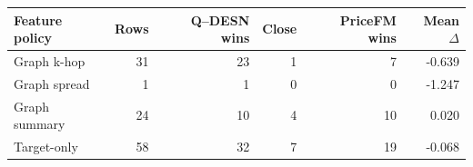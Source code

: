 \begin{tabular}{lrrrrr}
\toprule
Feature policy & Rows & Q--DESN wins & Close & PriceFM wins & Mean $\Delta$ \\
\midrule
Graph k-hop & 31 & 23 & 1 & 7 & -0.639 \\
Graph spread & 1 & 1 & 0 & 0 & -1.247 \\
Graph summary & 24 & 10 & 4 & 10 & 0.020 \\
Target-only & 58 & 32 & 7 & 19 & -0.068 \\
\bottomrule
\end{tabular}
